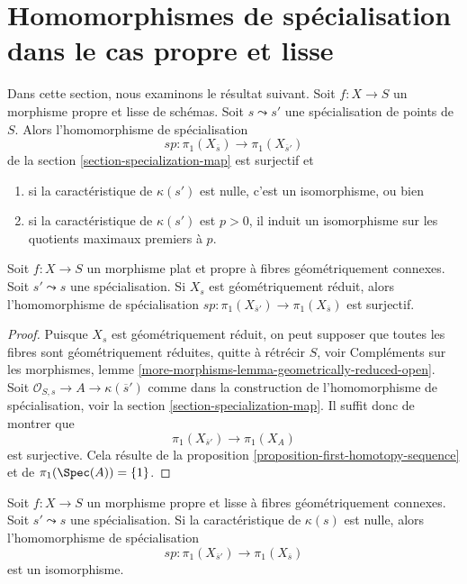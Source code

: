\section{Homomorphismes de spécialisation dans le cas propre et lisse}
\label{section-specialization-smooth-proper}

\noindent
Dans cette section, nous examinons le résultat suivant.
Soit $f : X \to S$ un morphisme propre et lisse de schémas.
Soit $s \leadsto s'$ une spécialisation de points de $S$.
Alors l'homomorphisme de spécialisation
$$
sp : \pi_1(X_{\overline{s}}) \longrightarrow \pi_1(X_{\overline{s}'})
$$
de la section \ref{section-specialization-map}
est surjectif et
\begin{enumerate}
\item si la caractéristique de $\kappa(s')$ est nulle, c'est
un isomorphisme, ou bien
\item si la caractéristique de $\kappa(s')$ est $p > 0$, il
induit un isomorphisme sur les quotients maximaux premiers à $p$.
\end{enumerate}

\begin{lemma}
\label{lemma-specialization-map-surjective}
Soit $f : X \to S$ un morphisme plat et propre à fibres géométriquement
connexes. Soit $s' \leadsto s$ une spécialisation.
Si $X_s$ est géométriquement réduit, alors l'homomorphisme de
spécialisation $sp : \pi_1(X_{\overline{s}'}) \to \pi_1(X_{\overline{s}})$
est surjectif.
\end{lemma}

\begin{proof}
Puisque $X_s$ est géométriquement réduit, on peut supposer que toutes les
fibres sont géométriquement réduites, quitte à rétrécir $S$, voir
Compléments sur les morphismes, lemme \ref{more-morphisms-lemma-geometrically-reduced-open}.
Soit $\mathcal{O}_{S, s} \to A \to \kappa(\overline{s}')$ comme
dans la construction de l'homomorphisme de spécialisation, voir la
section \ref{section-specialization-map}.
Il suffit donc de montrer que
$$
\pi_1(X_{\overline{s}'}) \to \pi_1(X_A)
$$
est surjective. Cela résulte de la
proposition \ref{proposition-first-homotopy-sequence}
et de $\pi_1(\Spec(A)) = \{1\}$.
\end{proof}

\begin{proposition}
\label{proposition-specialization-map-isomorphism}
Soit $f : X \to S$ un morphisme propre et lisse à fibres géométriquement
connexes. Soit $s' \leadsto s$ une spécialisation.
Si la caractéristique de $\kappa(s)$ est nulle, alors l'homomorphisme de
spécialisation
$$
sp : \pi_1(X_{\overline{s}'}) \to \pi_1(X_{\overline{s}})
$$
est un isomorphisme.
\end{proposition}

